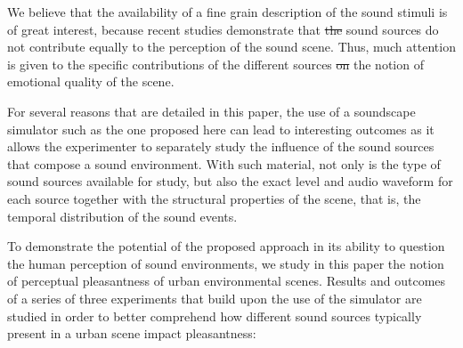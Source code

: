 \documentclass[12pt]{elsarticle}
\providecommand{\DIFadd}[1]{{\protect\color{blue}\uwave{#1}}} %
\providecommand{\DIFdel}[1]{{\protect\color{red}\sout{#1}}}                      %
\providecommand{\DIFaddbegin}{} %
\providecommand{\DIFaddend}{} %
\providecommand{\DIFdelbegin}{} %
\providecommand{\DIFdelend}{} %
\begin{document}
We believe that the availability of a fine grain description of the sound stimuli is of great interest, because recent studies demonstrate that \DIFdelbegin \DIFdel{the }\DIFdelend \DIFaddbegin \DIFadd{all }\DIFaddend sound sources do not contribute equally to the perception of the sound scene\DIFaddbegin \DIFadd{, see~}\DIFaddend \cite{defreville2004aactivity,lavandier2006contribution,guastavino2006ideal,nilsson2007soundscape,szeremeta2009analysis}. Thus, much attention is given to the specific contributions of the different sources \DIFdelbegin \DIFdel{on }\DIFdelend \DIFaddbegin \DIFadd{to }\DIFaddend the notion of emotional quality of the scene\DIFaddbegin \DIFadd{, see~}\DIFaddend \cite{gozalo2015relationship,ricciardi2015sound}.


For several reasons that are detailed in this paper, the use of a soundscape simulator such as the one proposed here can lead to interesting outcomes as it allows the experimenter to separately study  the influence of the sound sources that compose a sound environment. With such material, not only is the type of sound sources available for study, but also the exact \DIFaddbegin \DIFadd{sound }\DIFaddend level and audio waveform for each source together with the structural properties of the scene, that is, the temporal distribution of the sound events.


To demonstrate the potential of the proposed approach in its ability to question the human perception of sound environments, we study in this paper the notion of perceptual pleasantness of urban environmental scenes. Results and outcomes of a series of three experiments that build upon the use of the simulator are studied in order to better comprehend how different sound sources typically present in a urban scene impact pleasantness:
\end{document}
